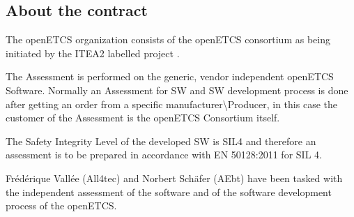 \bigskip

\clearpage
\bigskip

\subsection{About the contract}

The openETCS organization consists of the openETCS consortium \cite{openETCS} as being initiated by the ITEA2 labelled project \cite{openETCSITEA2}. 

The Assessment is performed on the generic, vendor independent openETCS Software. 
Normally an Assessment for SW and SW development process is done after getting an order from a specific manufacturer{\textbackslash}Producer, 
in this case the customer of the Assessment is the openETCS Consortium itself.

The Safety Integrity Level of the developed SW is SIL4 and therefore an assessment is to be prepared in
accordance with EN 50128:2011 for SIL 4.

Fr\'ed\'erique Vall\'ee (All4tec) and Norbert Sch\"afer (AEbt) have been tasked with the independent assessment of the software and of the software development process of the openETCS.


\bigskip